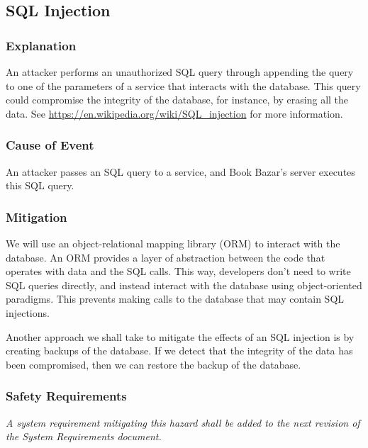 \documentclass[fullpage]{article}
\begin{document}
\subsection{SQL Injection}

\subsubsection*{Explanation}
An attacker performs an unauthorized SQL query through appending the query to one of the parameters of a service that interacts with the database. This query could compromise the integrity of the database, for instance, by erasing all the data. See \url{https://en.wikipedia.org/wiki/SQL_injection} for more information.

\subsubsection*{Cause of Event}
An attacker passes an SQL query to a service, and Book Bazar’s server executes this SQL query.

\subsubsection*{Mitigation}
We will use an object-relational mapping library (ORM) to interact with the database. An ORM provides a layer of abstraction between the code that operates with data and the SQL calls. This way, developers don’t need to write SQL queries directly, and instead interact with the database using object-oriented paradigms. This prevents making calls to the database that may contain SQL injections.

Another approach we shall take to mitigate the effects of an SQL injection is by creating backups of the database. If we detect that the integrity of the data has been compromised, then we can restore the backup of the database.

\subsubsection*{Safety Requirements}
\emph{A system requirement mitigating this hazard shall be added to the next revision of the System Requirements document.}

\begin{comment}
\begin{thebibliography}{9}

\bibitem{website}
S. Liu, “Canada most popular desktop browsers 2021,” Statista, 04-Oct-2021. [Online]. Available: https://www.statista.com/statistics/499462/most-popular-desktop-browsers-in-canada-by-market-share/. [Accessed: 17-Oct-2021].

\end{thebibliography}
\end{comment}
\end{document}
